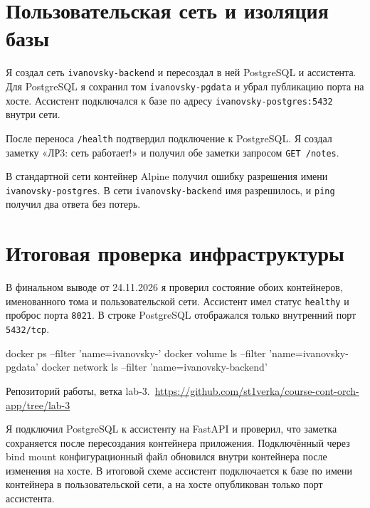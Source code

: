 
\chapter{Пользовательская сеть и изоляция базы}
Я создал сеть \texttt{ivanovsky-backend} и пересоздал в ней PostgreSQL и ассистента. Для PostgreSQL я сохранил том \texttt{ivanovsky-pgdata} и убрал публикацию порта на хосте. Ассистент подключался к базе по адресу \texttt{ivanovsky-postgres:5432} внутри сети.

После переноса \texttt{/health} подтвердил подключение к PostgreSQL. Я создал заметку «ЛР3: сеть работает!» и получил обе заметки запросом \texttt{GET /notes}.

В стандартной сети контейнер Alpine получил ошибку разрешения имени \texttt{ivanovsky-postgres}. В сети \texttt{ivanovsky-backend} имя разрешилось, и \texttt{ping} получил два ответа без потерь.



\chapter{Итоговая проверка инфраструктуры}
В финальном выводе от 24.11.2026 я проверил состояние обоих контейнеров, именованного тома и пользовательской сети. Ассистент имел статус \texttt{healthy} и проброс порта \texttt{8021}. В строке PostgreSQL отображался только внутренний порт \texttt{5432/tcp}.

\begin{code}
docker ps --filter 'name=ivanovsky-'
docker volume ls --filter 'name=ivanovsky-pgdata'
docker network ls --filter 'name=ivanovsky-backend'
\end{code}


Репозиторий работы, ветка lab-3.\ \url{https://github.com/st1verka/course-cont-orch-app/tree/lab-3}

Я подключил PostgreSQL к ассистенту на FastAPI и проверил, что заметка сохраняется после пересоздания контейнера приложения. Подключённый через bind mount конфигурационный файл обновился внутри контейнера после изменения на хосте. В итоговой схеме ассистент подключается к базе по имени контейнера в пользовательской сети, а на хосте опубликован только порт ассистента.

